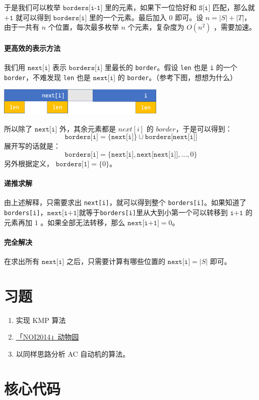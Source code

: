 \documentclass{article}
\begin{document}
于是我们可以枚举 $\texttt{borders[i-1]}$ 里的元素，如果下一位恰好和 $\texttt{S[i]}$ 匹配，那么就 $\texttt{+1}$ 就可以得到 $\texttt{borders[i]}$ 里的一个元素。最后加入 $0$ 即可。设 $n = |S|+|T|$，由于一共有 $n$ 个位置，每次最多枚举 $n$ 个元素，复杂度为 $O(n^2)$ ，需要加速。

\dotfill

\paragraph{更高效的表示方法}我们用 $\texttt{next[i]}$ 表示 $\texttt{borders[i]}$ 里最长的 \texttt{border}。假设 \texttt{len} 也是 \texttt{i} 的一个 \texttt{border}，不难发现 \texttt{len} 也是 $\texttt{next[i]}$ 的 \texttt{border}。（参考下图，想想为什么）

\begin{center}
\includegraphics[width=8cm]{2.png}
\end{center}

所以除了 $\texttt{next[i]}$ 外，其余元素都是 $next[i]$ 的 $border$，于是可以得到：
    $$\texttt{borders[i]} = \{\texttt{next[i]}\} \cup \texttt{borders[next[i]]}$$
展开写的话就是：
    $$\texttt{borders[i]} = \{\texttt{next[i]},\texttt{next[next[i]]},\ldots,0\}$$
另外根据定义， $\texttt{borders[1]} = \{0\}$。

\dotfill

\paragraph{递推求解} 由上述解释，只需要求出 \texttt{next[i]}，就可以得到整个 \texttt{borders[i]}。如果知道了\texttt{borders[i]}，$\texttt{next[i+1]}$就等于\texttt{borders[i]}里从大到小第一个可以转移到 $\texttt{i+1}$ 的元素再加 $1$  。如果全部无法转移，那么 $\texttt{next[i+1]} = 0$。

\dotfill

\paragraph{完全解决} 

在求出所有 $\texttt{next[i]}$ 之后，只需要计算有哪些位置的 $\texttt{next[i]} = |S|$ 即可。

\section{习题}
\begin{enumerate}
\item 实现 KMP 算法
\item \href{https://loj.ac/problem/2246}{「NOI2014」动物园}
\item 以同样思路分析 AC 自动机的算法。

\end{enumerate}

\newpage
\section{核心代码}
\inputminted[linenos,autogobble]{cpp}{kmp.cpp}
\end{document}

